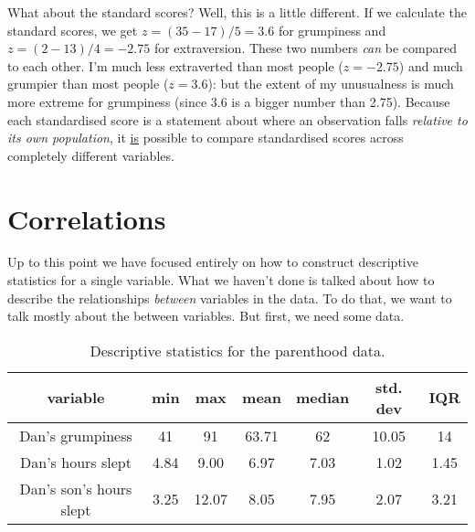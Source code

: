 What about the standard scores? Well, this is a little different. If we calculate the standard scores, we get $z = (35-17)/5 = 3.6$ for grumpiness and $z = (2-13)/4 = -2.75$ for extraversion. These two numbers {\it can} be compared to each other. I'm much less extraverted than most people ($z = -2.75$) and much grumpier than most people ($z = 3.6$): but the extent of my unusualness is much more extreme for grumpiness (since 3.6 is a bigger number than 2.75).  Because each standardised score is a statement about where an observation falls {\it relative to its own population}, it \underline{is} possible to compare standardised scores across completely different variables. 


\section{Correlations\label{sec:correl}}

Up to this point we have focused entirely on how to construct descriptive statistics for a single variable. What we haven't done is talked about how to describe the relationships {\it between} variables in the data. To do that, we want to talk mostly about the  between variables. But first, we need some data.


\begin{table}[t]
\caption{Descriptive statistics for the parenthood data.} \tabcapsep
\label{tab:parenthood}
\begin{center}
\begin{tabular}{c|cccccc}  
variable & min & max & mean & median & std. dev & IQR \\ \hline
Dan's grumpiness & 41 & 91 & 63.71 & 62 & 10.05 & 14 \\
Dan's hours slept & 4.84 & 9.00 & 6.97 & 7.03 & 1.02 & 1.45  \\
Dan's son's hours slept & 3.25 & 12.07 & 8.05 & 7.95 & 2.07 & 3.21 \\ 
\end{tabular}
\tabcapsep
\HR
\end{center}
\end{table}


